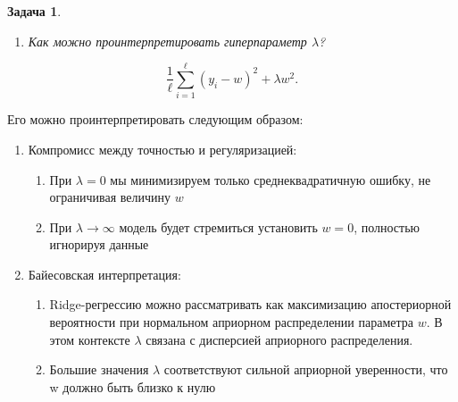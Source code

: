 \documentclass[a4paper,12pt]{article}
\theoremstyle{mystyle}
\newtheorem{esProblem}{Задача}
\begin{document}
\begin{esProblem}
\begin{enumerate}
\begin{enumerate}
\[\begin{cases}
0, & \text{если } \left|\sum_{i=1}^{\ell} y_i x_i\right| \leq \frac{\ell\lambda}{2}, \\
\frac{\sum_{i=1}^{\ell} y_i x_i + \frac{\ell\lambda}{2}}{\sum_{i=1}^{\ell} x_i^2}, & \text{если }
\sum_{i=1}^{\ell} y_i x_i < -\frac{\ell\lambda}{2}.
\end{cases}
 	   \]
	   При $\lambda \to \infty$ правая часть неравенства условий $\to \infty$, соответственно первая и третья строка невозможны, всегда
	   \[
	   -\infty \leq \left|\sum_{i=1}^{\ell} y_i x_i\right| \leq \infty \\
	    \]
	    \[
	   \lim_{\lambda \to \infty}  \hat{w}_L = 0
	  \]
	\end{enumerate}
        
        
    \item Как можно проинтерпретировать гиперпараметр $\lambda$? 
\end{enumerate}
\end{esProblem}
\begin{equation*} 
    \frac{1}{\ell}\sum_{i=1}^{\ell} (y_i - w)^2 + \lambda w^2.
\end{equation*} 

Его можно проинтерпретировать следующим образом:
\begin{enumerate}
	\item Компромисс между точностью и регуляризацией:
	\begin{enumerate}
		\item При $\lambda = 0$ мы минимизируем только среднеквадратичную ошибку, не ограничивая величину $w$
		\item При $\lambda \to \infty$  модель будет стремиться установить $w = 0$, полностью игнорируя данные
	\end{enumerate} 
	\item Байесовская интерпретация:
	\begin{enumerate}
		\item Ridge-регрессию можно рассматривать как максимизацию апостериорной вероятности при нормальном априорном распределении параметра $w$. В этом контексте $\lambda$ связана с дисперсией априорного распределения.
		\item Большие значения $\lambda$ соответствуют сильной априорной уверенности, что w должно быть близко к нулю
	\end{enumerate}
\end{enumerate} 
\end{document}
